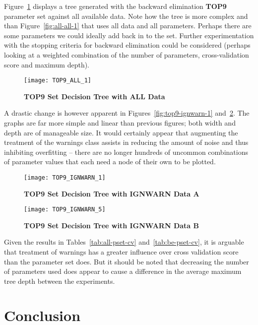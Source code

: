 Figure~\ref{fig:top9-all-1} displays a tree generated with the backward
elimination \textbf{TOP9} parameter set against all available data. Note how the
tree is more complex and than Figure~\ref{fig:all-all-1} that uses all data and
all parameters. Perhaps there are some parameters we could ideally add back in
to the set. Further experimentation with the stopping criteria for backward
elimination could be considered (perhaps looking at a weighted combination
of the number of parameters, cross-validation score and maximum depth).

\begin{figure}[htbp!]
    \centering
    \texttt{[image: TOP9\_ALL\_1]}
    \caption[top9-all-1]{\textbf{TOP9 Set Decision Tree with ALL Data}}
    \label{fig:top9-all-1}
\end{figure}


A drastic change is however apparent in Figures~\ref{fig:top9-ignwarn-1}
and~\ref{fig:top9-ignwarn-2}. The graphs are far more simple and linear than
previous figures; both width and depth are of manageable size. It would
certainly appear that augmenting the treatment of the warnings class assists in
reducing the amount of noise and thus inhibiting overfitting -- there are no
longer hundreds of uncommon combinations of parameter values that each need a
node of their own to be plotted.


\begin{figure}[htbp!]
    \centering
    \texttt{[image: TOP9\_IGNWARN\_1]}
    \caption[top9-ignwarn-1]{\textbf{TOP9 Set Decision Tree with IGNWARN Data A}}
    \label{fig:top9-ignwarn-1}

    \vspace{10mm}

    \texttt{[image: TOP9\_IGNWARN\_5]}
    \caption[top9-ignwarn-2]{\textbf{TOP9 Set Decision Tree with IGNWARN Data B}}
    \label{fig:top9-ignwarn-2}
\end{figure}


Given the results in Tables~\ref{tab:all-pset-cv} and~\ref{tab:be-pset-cv}, it
is arguable that treatment of warnings has a greater influence over cross
validation score than the parameter set does. But it should be noted that
decreasing the number of parameters used does appear to cause a difference in
the average maximum tree depth between the experiments.


\section{Conclusion}


